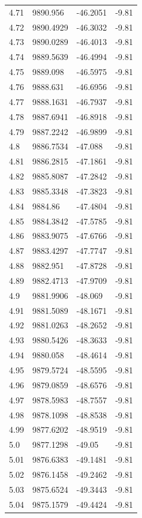 \begin{table}[H]
\begin{tabular}{llll}
4.71 & 9890.956 & -46.2051 & -9.81 \\
4.72 & 9890.4929 & -46.3032 & -9.81 \\
4.73 & 9890.0289 & -46.4013 & -9.81 \\
4.74 & 9889.5639 & -46.4994 & -9.81 \\
4.75 & 9889.098 & -46.5975 & -9.81 \\
4.76 & 9888.631 & -46.6956 & -9.81 \\
4.77 & 9888.1631 & -46.7937 & -9.81 \\
4.78 & 9887.6941 & -46.8918 & -9.81 \\
4.79 & 9887.2242 & -46.9899 & -9.81 \\
4.8 & 9886.7534 & -47.088 & -9.81 \\
4.81 & 9886.2815 & -47.1861 & -9.81 \\
4.82 & 9885.8087 & -47.2842 & -9.81 \\
4.83 & 9885.3348 & -47.3823 & -9.81 \\
4.84 & 9884.86 & -47.4804 & -9.81 \\
4.85 & 9884.3842 & -47.5785 & -9.81 \\
4.86 & 9883.9075 & -47.6766 & -9.81 \\
4.87 & 9883.4297 & -47.7747 & -9.81 \\
4.88 & 9882.951 & -47.8728 & -9.81 \\
4.89 & 9882.4713 & -47.9709 & -9.81 \\
4.9 & 9881.9906 & -48.069 & -9.81 \\
4.91 & 9881.5089 & -48.1671 & -9.81 \\
4.92 & 9881.0263 & -48.2652 & -9.81 \\
4.93 & 9880.5426 & -48.3633 & -9.81 \\
4.94 & 9880.058 & -48.4614 & -9.81 \\
4.95 & 9879.5724 & -48.5595 & -9.81 \\
4.96 & 9879.0859 & -48.6576 & -9.81 \\
4.97 & 9878.5983 & -48.7557 & -9.81 \\
4.98 & 9878.1098 & -48.8538 & -9.81 \\
4.99 & 9877.6202 & -48.9519 & -9.81 \\
5.0 & 9877.1298 & -49.05 & -9.81 \\
5.01 & 9876.6383 & -49.1481 & -9.81 \\
5.02 & 9876.1458 & -49.2462 & -9.81 \\
5.03 & 9875.6524 & -49.3443 & -9.81 \\
5.04 & 9875.1579 & -49.4424 & -9.81 \\

\end{tabular}
\end{table}
